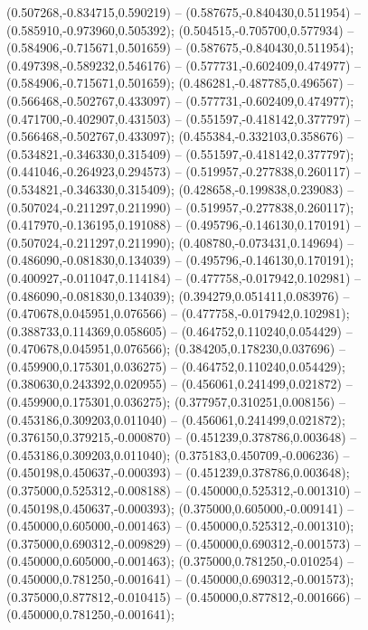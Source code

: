  (0.507268,-0.834715,0.590219) -- (0.587675,-0.840430,0.511954) -- (0.585910,-0.973960,0.505392);
 (0.504515,-0.705700,0.577934) -- (0.584906,-0.715671,0.501659) -- (0.587675,-0.840430,0.511954);
 (0.497398,-0.589232,0.546176) -- (0.577731,-0.602409,0.474977) -- (0.584906,-0.715671,0.501659);
 (0.486281,-0.487785,0.496567) -- (0.566468,-0.502767,0.433097) -- (0.577731,-0.602409,0.474977);
 (0.471700,-0.402907,0.431503) -- (0.551597,-0.418142,0.377797) -- (0.566468,-0.502767,0.433097);
 (0.455384,-0.332103,0.358676) -- (0.534821,-0.346330,0.315409) -- (0.551597,-0.418142,0.377797);
 (0.441046,-0.264923,0.294573) -- (0.519957,-0.277838,0.260117) -- (0.534821,-0.346330,0.315409);
 (0.428658,-0.199838,0.239083) -- (0.507024,-0.211297,0.211990) -- (0.519957,-0.277838,0.260117);
 (0.417970,-0.136195,0.191088) -- (0.495796,-0.146130,0.170191) -- (0.507024,-0.211297,0.211990);
 (0.408780,-0.073431,0.149694) -- (0.486090,-0.081830,0.134039) -- (0.495796,-0.146130,0.170191);
 (0.400927,-0.011047,0.114184) -- (0.477758,-0.017942,0.102981) -- (0.486090,-0.081830,0.134039);
 (0.394279,0.051411,0.083976) -- (0.470678,0.045951,0.076566) -- (0.477758,-0.017942,0.102981);
 (0.388733,0.114369,0.058605) -- (0.464752,0.110240,0.054429) -- (0.470678,0.045951,0.076566);
 (0.384205,0.178230,0.037696) -- (0.459900,0.175301,0.036275) -- (0.464752,0.110240,0.054429);
 (0.380630,0.243392,0.020955) -- (0.456061,0.241499,0.021872) -- (0.459900,0.175301,0.036275);
 (0.377957,0.310251,0.008156) -- (0.453186,0.309203,0.011040) -- (0.456061,0.241499,0.021872);
 (0.376150,0.379215,-0.000870) -- (0.451239,0.378786,0.003648) -- (0.453186,0.309203,0.011040);
 (0.375183,0.450709,-0.006236) -- (0.450198,0.450637,-0.000393) -- (0.451239,0.378786,0.003648);
 (0.375000,0.525312,-0.008188) -- (0.450000,0.525312,-0.001310) -- (0.450198,0.450637,-0.000393);
 (0.375000,0.605000,-0.009141) -- (0.450000,0.605000,-0.001463) -- (0.450000,0.525312,-0.001310);
 (0.375000,0.690312,-0.009829) -- (0.450000,0.690312,-0.001573) -- (0.450000,0.605000,-0.001463);
 (0.375000,0.781250,-0.010254) -- (0.450000,0.781250,-0.001641) -- (0.450000,0.690312,-0.001573);
 (0.375000,0.877812,-0.010415) -- (0.450000,0.877812,-0.001666) -- (0.450000,0.781250,-0.001641);
